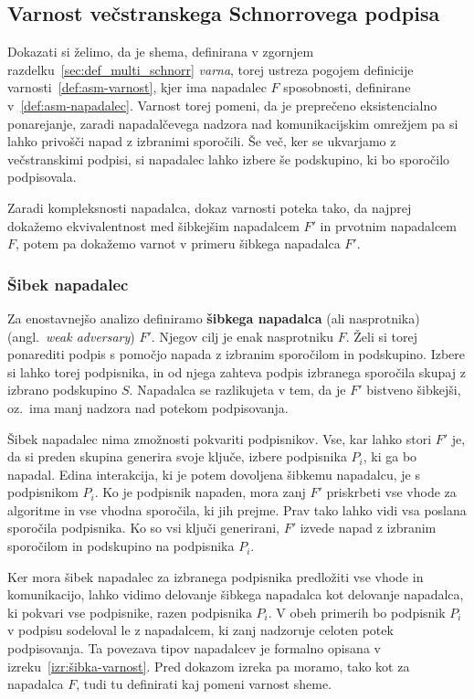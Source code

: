 \documentclass[isrm2, tisk]{fmfdelo}
\begin{document}
\subsection{Varnost večstranskega Schnorrovega podpisa}
\label{sec:proof_multi_schnorr}
Dokazati si želimo, da je shema, definirana v zgornjem razdelku~\ref{sec:def_multi_schnorr} \textit{varna},
torej ustreza pogojem definicije varnosti~\ref{def:asm-varnost}, kjer ima napadalec $F$ sposobnosti,
definirane v~\ref{def:asm-napadalec}. Varnost torej pomeni, da je preprečeno eksistencialno ponarejanje,
zaradi napadalčevega nadzora nad komunikacijskim omrežjem pa si lahko privošči napad z izbranimi sporočili.
Še več, ker se ukvarjamo z večstranskimi podpisi, si napadalec lahko izbere še podskupino, ki bo 
sporočilo podpisovala.

Zaradi kompleksnosti napadalca, dokaz varnosti poteka tako, da najprej dokažemo ekvivalentnost med
šibkejšim napadalcem $F'$ in prvotnim napadalcem $F$, potem pa dokažemo varnot v primeru šibkega
napadalca $F'$.

\subsubsection{Šibek napadalec}
Za enostavnejšo analizo definiramo \textbf{šibkega napadalca} (ali nasprotnika) (angl.\ 
\textit{weak adversary}) $F'$. Njegov cilj je enak nasprotniku $F$. Želi si torej ponarediti podpis
s pomočjo napada z izbranim sporočilom in podskupino. Izbere si lahko torej podpisnika, in od njega
zahteva podpis izbranega sporočila skupaj z izbrano podskupino $S$. Napadalca se razlikujeta v tem,
da je $F'$ bistveno šibkejši, oz.\ ima manj nadzora nad potekom podpisovanja.

Šibek napadalec nima zmožnosti pokvariti podpisnikov. Vse, kar lahko stori $F'$ je, da si preden skupina
generira svoje ključe, izbere podpisnika $P_i$, ki ga bo napadal. Edina interakcija, ki je potem dovoljena
šibkemu napadalcu, je s podpisnikom $P_i$. Ko je podpisnik napaden, mora zanj $F'$ priskrbeti vse vhode
za algoritme in vse vhodna sporočila, ki jih prejme. Prav tako lahko vidi vsa poslana sporočila
podpisnika. Ko so vsi ključi generirani, $F'$ izvede napad z izbranim sporočilom in podskupino na
podpisnika $P_i$.

Ker mora šibek napadalec za izbranega podpisnika predložiti vse vhode in komunikacijo, lahko vidimo
delovanje šibkega napadalca kot delovanje napadalca, ki pokvari vse podpisnike, razen podpisnika $P_i$.
V obeh primerih bo podpisnik $P_i$ v podpisu sodeloval le z napadalcem, ki zanj nadzoruje celoten
potek podpisovanja. Ta povezava tipov napadalcev je formalno opisana v izreku~\ref{izr:šibka-varnost}.
Pred dokazom izreka pa moramo, tako kot za napadalca $F$, tudi tu definirati kaj pomeni varnost sheme.
\end{document}
